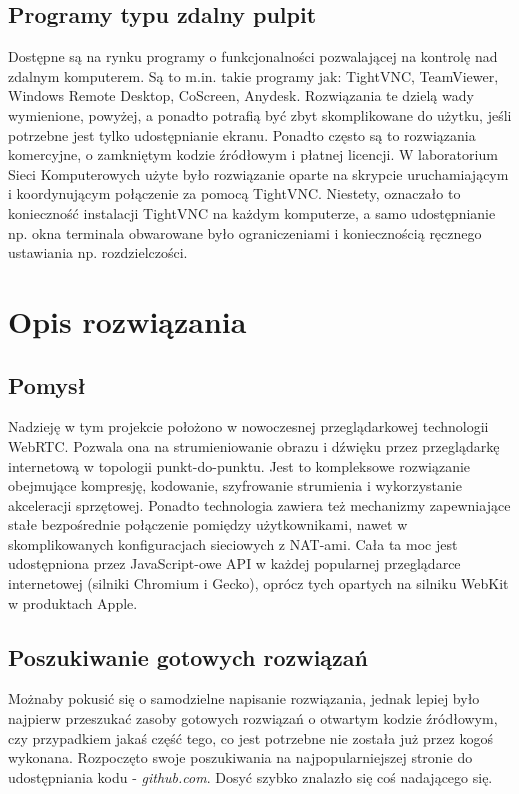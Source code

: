 \documentclass[a4paper,11pt]{article}
\begin{document}
        \subsection{Programy typu zdalny pulpit}
        Dostępne są na rynku programy o funkcjonalności pozwalającej na kontrolę nad zdalnym komputerem. 
        Są to m.in. takie programy jak: TightVNC, TeamViewer, Windows Remote Desktop, CoScreen, Anydesk. 
        Rozwiązania te dzielą wady wymienione, powyżej, a ponadto potrafią być zbyt skomplikowane do użytku, jeśli potrzebne jest tylko udostępnianie ekranu. 
        Ponadto często są to rozwiązania komercyjne, o zamkniętym kodzie źródłowym i płatnej licencji. 
        W laboratorium Sieci Komputerowych użyte było rozwiązanie oparte na skrypcie uruchamiającym i koordynującym połączenie za pomocą TightVNC. 
        Niestety, oznaczało to konieczność instalacji TightVNC na każdym komputerze, a samo udostępnianie np. okna terminala obwarowane było ograniczeniami i koniecznością ręcznego ustawiania np. rozdzielczości. 
    \section{Opis rozwiązania}
        \subsection{Pomysł}
        Nadzieję w tym projekcie położono w nowoczesnej przeglądarkowej technologii WebRTC. Pozwala ona na strumieniowanie obrazu i dźwięku przez przeglądarkę internetową w topologii punkt-do-punktu. 
        Jest to kompleksowe rozwiązanie obejmujące kompresję, kodowanie, szyfrowanie strumienia i wykorzystanie akceleracji sprzętowej.
        Ponadto technologia zawiera też mechanizmy zapewniające stałe bezpośrednie połączenie pomiędzy użytkownikami, nawet w skomplikowanych konfiguracjach sieciowych z NAT-ami.
        Cała ta moc jest udostępniona przez JavaScript-owe API w każdej popularnej przeglądarce internetowej (silniki Chromium i Gecko), oprócz tych opartych na silniku WebKit w produktach Apple. 
        \subsection{Poszukiwanie gotowych rozwiązań}
        Możnaby pokusić się o samodzielne napisanie rozwiązania, jednak lepiej było najpierw przeszukać zasoby gotowych rozwiązań o otwartym kodzie źródłowym,
        czy przypadkiem jakaś część tego, co jest potrzebne nie została już przez kogoś wykonana.
        Rozpoczęto swoje poszukiwania na najpopularniejszej stronie do udostępniania kodu - \emph{github.com}. Dosyć szybko znalazło się coś nadającego się.
\end{document}
